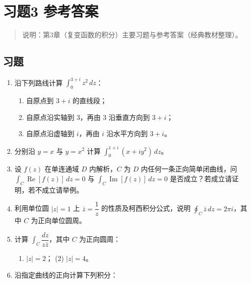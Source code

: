 \chapter{习题3 参考答案}\label{ux4e60ux98983-ux53c2ux8003ux7b54ux6848}

\begin{quote}
说明：第3章（复变函数的积分）主要习题与参考答案（经典教材整理）。
\end{quote}

\section{习题}\label{ux4e60ux9898-2}

\begin{enumerate}
\def\labelenumi{\arabic{enumi}.}
\item
  沿下列路线计算 \(\displaystyle\int_0^{3+i} z^2\,dz\)：

  \begin{enumerate}
  \def\labelenumii{(\arabic{enumii})}
  \tightlist
  \item
    自原点到 \(3+i\) 的直线段；
  \item
    自原点沿实轴到 \(3\)，再由 \(3\) 沿垂直方向到 \(3+i\)；
  \item
    自原点沿虚轴到 \(i\)，再由 \(i\) 沿水平方向到 \(3+i\)。
  \end{enumerate}
\item
  分别沿 \(y=x\) 与 \(y=x^2\) 计算
  \(\displaystyle\int_0^{1+i}(x+iy^2)\,dz\)。
\item
  设 \(f(z)\) 在单连通域 \(D\) 内解析，\(C\) 为 \(D\)
  内任何一条正向简单闭曲线，问
  \(\displaystyle\int_C \operatorname{Re}[f(z)]\,dz=0\) 与
  \(\displaystyle\int_C \operatorname{Im}[f(z)]\,dz=0\)
  是否成立？若成立请证明，若不成立请举例。
\item
  利用单位圆 \(|z|=1\) 上 \(\bar z=\dfrac1z\) 的性质及柯西积分公式，说明
  \(\displaystyle\oint_C \bar z\,dz=2\pi i\)，其中 \(C\)
  为正向单位圆周。
\item
  计算 \(\displaystyle\int_C \dfrac{dz}{z\bar z}\)，其中 \(C\)
  为正向圆周：

  \begin{enumerate}
  \def\labelenumii{(\arabic{enumii})}
  \tightlist
  \item
    \(|z|=2\)； (2) \(|z|=4\)。
  \end{enumerate}
\item
  沿指定曲线的正向计算下列积分：


\end{enumerate}
